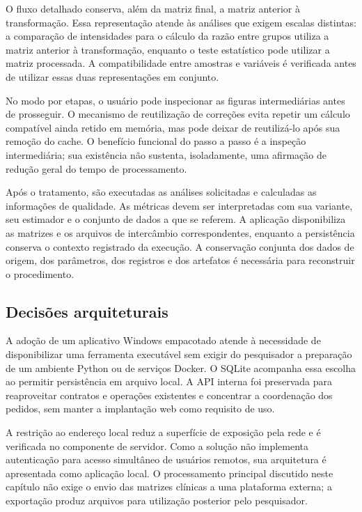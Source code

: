 O fluxo detalhado conserva, além da matriz final, a matriz anterior à transformação. Essa representação atende às análises que exigem escalas distintas: a comparação de intensidades para o cálculo da razão entre grupos utiliza a matriz anterior à transformação, enquanto o teste estatístico pode utilizar a matriz processada. A compatibilidade entre amostras e variáveis é verificada antes de utilizar essas duas representações em conjunto.

No modo por etapas, o usuário pode inspecionar as figuras intermediárias antes de prosseguir. O mecanismo de reutilização de correções evita repetir um cálculo compatível ainda retido em memória, mas pode deixar de reutilizá-lo após sua remoção do cache. O benefício funcional do passo a passo é a inspeção intermediária; sua existência não sustenta, isoladamente, uma afirmação de redução geral do tempo de processamento.

Após o tratamento, são executadas as análises solicitadas e calculadas as informações de qualidade. As métricas devem ser interpretadas com sua variante, seu estimador e o conjunto de dados a que se referem. A aplicação disponibiliza as matrizes e os arquivos de intercâmbio correspondentes, enquanto a persistência conserva o contexto registrado da execução. A conservação conjunta dos dados de origem, dos parâmetros, dos registros e dos artefatos é necessária para reconstruir o procedimento.

\subsection{Decisões arquiteturais}

A adoção de um aplicativo Windows empacotado atende à necessidade de disponibilizar uma ferramenta executável sem exigir do pesquisador a preparação de um ambiente Python ou de serviços Docker. O SQLite acompanha essa escolha ao permitir persistência em arquivo local. A API interna foi preservada para reaproveitar contratos e operações existentes e concentrar a coordenação dos pedidos, sem manter a implantação web como requisito de uso.

A restrição ao endereço local reduz a superfície de exposição pela rede e é verificada no componente de servidor. Como a solução não implementa autenticação para acesso simultâneo de usuários remotos, sua arquitetura é apresentada como aplicação local. O processamento principal discutido neste capítulo não exige o envio das matrizes clínicas a uma plataforma externa; a exportação produz arquivos para utilização posterior pelo pesquisador.

